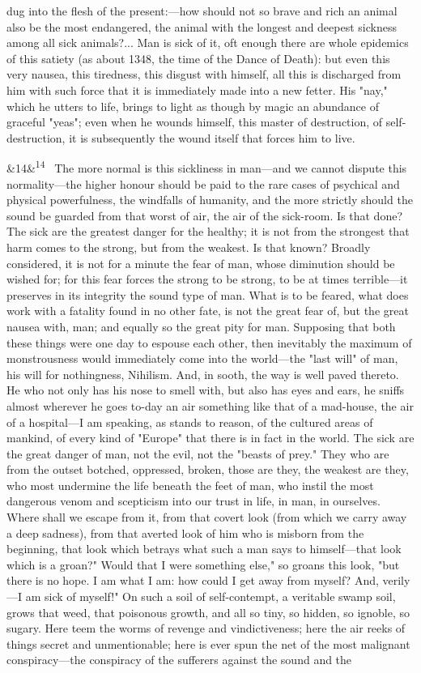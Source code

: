 \documentclass[12pt]{article}
\newcommand{\para}[1][]{\par\noindent\ifx&#1&\else\textsuperscript{\footnotesize #1}~\fi}
\begin{document}
dug into the flesh of the present:---how should not so brave and rich an animal also be the most endangered, the animal with the longest and deepest sickness among all sick animals?... Man is sick of it, oft enough there are whole epidemics of this satiety (as about 1348, the time of the Dance of Death): but even this very nausea, this tiredness, this disgust with himself, all this is discharged from him with such force that it is immediately made into a new fetter. His "nay," which he utters to life, brings to light as though by magic an abundance of graceful "yeas"; even when he wounds himself, this master of destruction, of self-destruction, it is subsequently the wound itself that forces him to live.

\para[14] The more normal is this sickliness in man---and we cannot dispute this normality---the higher honour should be paid to the rare cases of psychical and physical powerfulness, the windfalls of humanity, and the more strictly should the sound be guarded from that worst of air, the air of the sick-room. Is that done? The sick are the greatest danger for the healthy; it is not from the strongest that harm comes to the strong, but from the weakest. Is that known? Broadly considered, it is not for a minute the fear of man, whose diminution should be wished for; for this fear forces the strong to be strong, to be at times terrible---it preserves in its integrity the sound type of man. What is to be feared, what does work with a fatality found in no other fate, is not the great fear of, but the great nausea with, man; and equally so the great pity for man. Supposing that both these things were one day to espouse each other, then inevitably the maximum of monstrousness would immediately come into the world---the "last will" of man, his will for nothingness, Nihilism. And, in sooth, the way is well paved thereto. He who not only has his nose to smell with, but also has eyes and ears, he sniffs almost wherever he goes to-day an air something like that of a mad-house, the air of a hospital---I am speaking, as stands to reason, of the cultured areas of mankind, of every kind of "Europe" that there is in fact in the world. The sick are the great danger of man, not the evil, not the "beasts of prey." They who are from the outset botched, oppressed, broken, those are they, the weakest are they, who most undermine the life beneath the feet of man, who instil the most dangerous venom and scepticism into our trust in life, in man, in ourselves. Where shall we escape from it, from that covert look (from which we carry away a deep sadness), from that averted look of him who is misborn from the beginning, that look which betrays what such a man says to himself---that look which is a groan?" Would that I were something else," so groans this look, "but there is no hope. I am what I am: how could I get away from myself? And, verily---I am sick of myself!" On such a soil of self-contempt, a veritable swamp soil, grows that weed, that poisonous growth, and all so tiny, so hidden, so ignoble, so sugary. Here teem the worms of revenge and vindictiveness; here the air reeks of things secret and unmentionable; here is ever spun the net of the most malignant conspiracy---the conspiracy of the sufferers against the sound and the 
\end{document}
